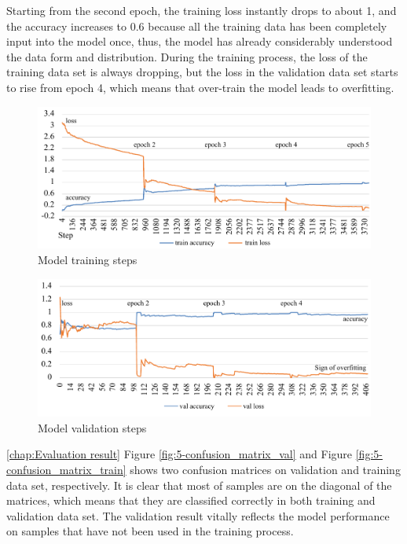Starting from the second epoch, the training loss instantly drops to about 1, and the accuracy increases to 0.6 because all the training data has been completely input into the model once, thus, the model has already considerably understood the data form and distribution.
During the training process, the loss of the training data set is always dropping, but the loss in the validation data set starts to rise from epoch 4, which means that over-train the model leads to overfitting.
\vspace*{-.5em}
\begin{figure}[!ht]
    \centering
    \includegraphics[width=.84\textwidth]{evaluation/imgs/5-train-step.pdf}
    \caption{Model training steps}
    \label{fig:5-train-step}
\end{figure}
\vspace*{-.5em}
\begin{figure}[!ht]
    \centering
    \includegraphics[width=.84\textwidth]{evaluation/imgs/5-val-steps.pdf}
    \caption{Model validation steps}
    \label{fig:5-val-steps}
\end{figure}

\ref{chap:Evaluation result} Figure \ref{fig:5-confusion_matrix_val} and Figure \ref{fig:5-confusion_matrix_train} shows two confusion matrices on validation and training data set, respectively.
It is clear that most of samples are on the diagonal of the matrices, which means that they are classified correctly in both training and validation data set.
The validation result vitally reflects the model performance on samples that have not been used in the training process.


